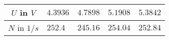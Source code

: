 \begin{tabular}{c|*{4}{*{1}{l}}}
$U$ in $\si{V}$ & $4.3936$ & $4.7898$ & $5.1908$ & $5.3842$ \\ \hline
$N$ in $\si{1/s}$ & $252.4$ & $245.16$ & $254.04$ & $252.84$\end{tabular}
